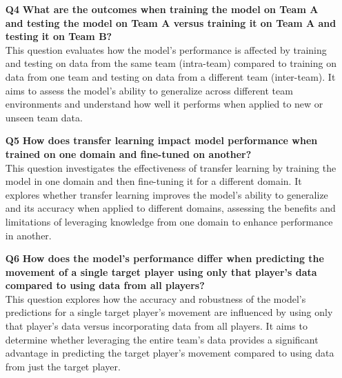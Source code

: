 \begin{itemize}
    \item[\textbf{Q4}] \textbf{What are the outcomes when training the model on Team A and testing the model on Team A versus training it on Team A and testing it on Team B?} \\
    This question evaluates how the model’s performance is affected by training and testing on data from the same team (intra-team) compared to training on data from one team and testing on data from a different team (inter-team). It aims to assess the model's ability to generalize across different team environments and understand how well it performs when applied to new or unseen team data.

    \item[\textbf{Q5}] \textbf{How does transfer learning impact model performance when trained on one domain and fine-tuned on another?} \\
    This question investigates the effectiveness of transfer learning by training the model in one domain and then fine-tuning it for a different domain. It explores whether transfer learning improves the model's ability to generalize and its accuracy when applied to different domains, assessing the benefits and limitations of leveraging knowledge from one domain to enhance performance in another.

    \item[\textbf{Q6}] \textbf{How does the model's performance differ when predicting the movement of a single target player using only that player’s data compared to using data from all players?} \\
    This question explores how the accuracy and robustness of the model’s predictions for a single target player’s movement are influenced by using only that player’s data versus incorporating data from all players. It aims to determine whether leveraging the entire team's data provides a significant advantage in predicting the target player’s movement compared to using data from just the target player.

\end{itemize}
